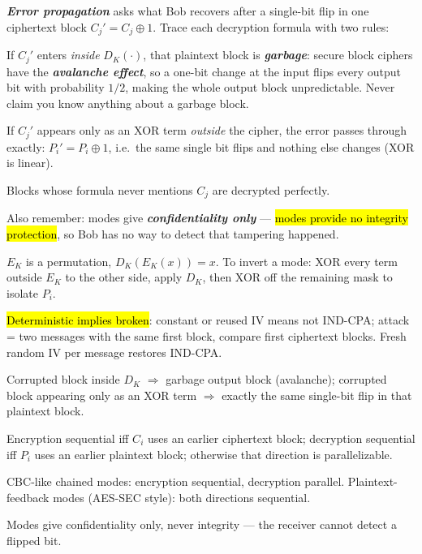\documentclass[12pt, a4paper]{article}
\newcommand{\term}[1]{\textbf{\textit{#1}}}        %
\newcommand{\imp}[1]{\hl{#1}}                       %
\begin{document}
\term{Error propagation} asks what Bob recovers after a single-bit flip in one ciphertext block $C_j' = C_j \oplus 1$. Trace each decryption formula with two rules:
\begin{tightitem}
    \item If $C_j'$ enters \emph{inside} $D_K(\cdot)$, that plaintext block is \term{garbage}: secure block ciphers have the \term{avalanche effect}, so a one-bit change at the input flips every output bit with probability $1/2$, making the whole output block unpredictable. Never claim you know anything about a garbage block.
    \item If $C_j'$ appears only as an XOR term \emph{outside} the cipher, the error passes through exactly: $P_i' = P_i \oplus 1$, i.e.\ the same single bit flips and nothing else changes (XOR is linear).
    \item Blocks whose formula never mentions $C_j$ are decrypted perfectly.
\end{tightitem}
Also remember: modes give \term{confidentiality only} --- \imp{modes provide no integrity protection}, so Bob has no way to detect that tampering happened.

\begin{theorybox}
\begin{tightitem}
    \item $E_K$ is a permutation, $D_K(E_K(x)) = x$. To invert a mode: XOR every term outside $E_K$ to the other side, apply $D_K$, then XOR off the remaining mask to isolate $P_i$.
    \item \imp{Deterministic implies broken}: constant or reused IV means not IND-CPA; attack = two messages with the same first block, compare first ciphertext blocks. Fresh random IV per message restores IND-CPA.
    \item Corrupted block inside $D_K$ $\Rightarrow$ garbage output block (avalanche); corrupted block appearing only as an XOR term $\Rightarrow$ exactly the same single-bit flip in that plaintext block.
    \item Encryption sequential iff $C_i$ uses an earlier ciphertext block; decryption sequential iff $P_i$ uses an earlier plaintext block; otherwise that direction is parallelizable.
    \item CBC-like chained modes: encryption sequential, decryption parallel. Plaintext-feedback modes (AES-SEC style): both directions sequential.
    \item Modes give confidentiality only, never integrity --- the receiver cannot detect a flipped bit.
\end{tightitem}
\end{theorybox}
\end{document}
